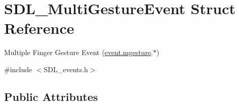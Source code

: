 \hypertarget{struct_s_d_l___multi_gesture_event}{}\section{S\+D\+L\+\_\+\+Multi\+Gesture\+Event Struct Reference}
\label{struct_s_d_l___multi_gesture_event}


Multiple Finger Gesture Event (\hyperlink{union_s_d_l___event_ac19b3c6a6b5181a51eb4fbe2cbe726a9}{event.\+mgesture}.$\ast$)  




{\ttfamily \#include $<$S\+D\+L\+\_\+events.\+h$>$}

\subsection*{Public Attributes}
